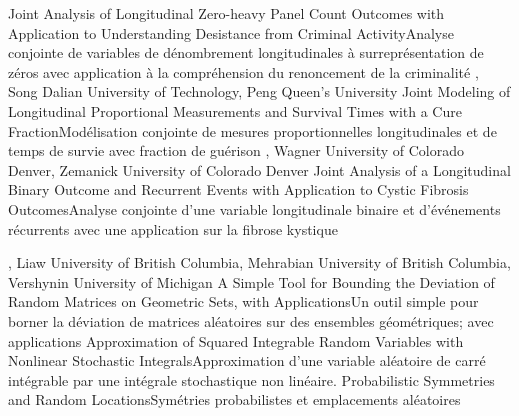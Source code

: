 
{
}
{Joint Analysis of Longitudinal Zero-heavy Panel Count Outcomes with Application to Understanding Desistance from Criminal Activity}{Analyse conjointe de variables de dénombrement longitudinales à surreprésentation de zéros avec application à la compréhension du renoncement de la criminalité}
{\bubbleE \enspace \screenE}
{
,  {Song}
{Dalian University of Technology},  {Peng}
{Queen's University}
}
{Joint Modeling of Longitudinal Proportional Measurements and Survival Times with a Cure Fraction}{Modélisation conjointe de mesures proportionnelles longitudinales et de temps de survie avec fraction de guérison}
{\bubbleE \enspace \screenE}
{
,  {Wagner}
{University of Colorado Denver},  {Zemanick}
{University of Colorado Denver}
}
{Joint Analysis of a Longitudinal Binary Outcome and Recurrent Events with Application to Cystic Fibrosis Outcomes}{Analyse conjointe d’une variable longitudinale binaire et d’événements récurrents avec une application sur la fibrose kystique}
{\bubbleE \enspace \screenE}


{
,  {Liaw}
{University of British Columbia},  {Mehrabian}
{University of British Columbia},  {Vershynin}
{University of Michigan}
}
{A Simple Tool for Bounding the Deviation of Random Matrices on Geometric Sets, with Applications}{Un outil simple pour borner la déviation de matrices aléatoires sur des ensembles géométriques; avec applications }
{\bubbleE \enspace \screenE}
{
}
{Approximation of Squared Integrable Random Variables with Nonlinear Stochastic Integrals}{Approximation d'une variable aléatoire de carré intégrable par une intégrale stochastique non linéaire. }
{\bubbleE \enspace \screenE}
{
}
{Probabilistic Symmetries and Random Locations}{Symétries probabilistes et emplacements aléatoires }
{\bubbleE \enspace \screenE}

